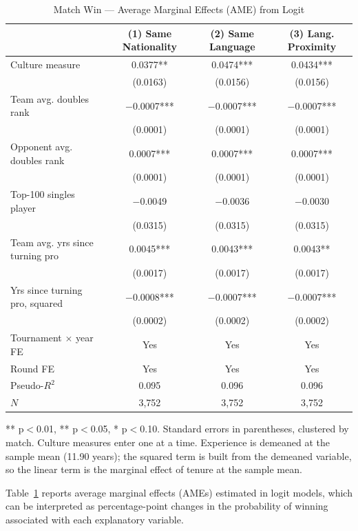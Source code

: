\documentclass[10pt]{article}
\begin{document}
\begin{table}[htbp]
\color{blue}
\centering
\caption{Match Win — Average Marginal Effects (AME) from Logit \label{tab:t3}}
\begin{threeparttable}
\begin{tabular}{lccc}
\toprule
 & (1) Same Nationality & (2) Same Language & (3) Lang. Proximity \\
\midrule
Culture measure & 0.0377** & 0.0474*** & 0.0434*** \\
 & (0.0163) & (0.0156) & (0.0156) \\
Team avg. doubles rank & $-$0.0007*** & $-$0.0007*** & $-$0.0007*** \\
 & (0.0001) & (0.0001) & (0.0001) \\
Opponent avg. doubles rank & 0.0007*** & 0.0007*** & 0.0007*** \\
 & (0.0001) & (0.0001) & (0.0001) \\
Top-100 singles player & $-$0.0049 & $-$0.0036 & $-$0.0030 \\
 & (0.0315) & (0.0315) & (0.0315) \\
Team avg. yrs since turning pro & 0.0045*** & 0.0043*** & 0.0043** \\
 & (0.0017) & (0.0017) & (0.0017) \\
Yrs since turning pro, squared & $-$0.0008*** & $-$0.0007*** & $-$0.0007*** \\
 & (0.0002) & (0.0002) & (0.0002) \\
\midrule
Tournament $\times$ year FE & Yes & Yes & Yes \\
Round FE & Yes & Yes & Yes \\
Pseudo-$R^2$ & 0.095 & 0.096 & 0.096 \\
$N$ & 3,752 & 3,752 & 3,752 \\
\bottomrule
\end{tabular}
\begin{tablenotes}
\small
\item *** p$<$0.01, ** p$<$0.05, * p$<$0.10. Standard errors in parentheses, clustered by match. Culture measures enter one at a time. Experience is demeaned at the sample mean (11.90 years); the squared term is built from the demeaned variable, so the linear term is the marginal effect of tenure at the sample mean.
\end{tablenotes}
\end{threeparttable}
\end{table}
\FloatBarrier

Table~\ref{tab:t3} reports average marginal effects (AMEs) estimated in logit models, which can be interpreted as percentage-point changes in the probability of winning associated with each explanatory variable.
\end{document}
